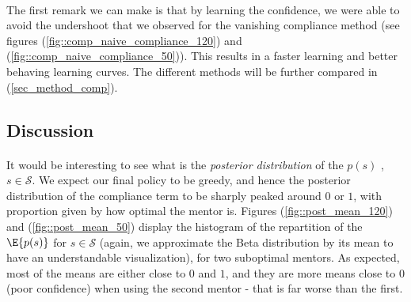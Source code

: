 \documentclass[a4paper]{report}
\begin{document}
{{{{			\paragraph{} The first remark we can make is that by learning the confidence, we were able  to avoid the undershoot that we observed for the vanishing compliance method (see figures (\ref{fig::comp_naive_compliance_120}) and (\ref{fig::comp_naive_compliance_50})). This results in a faster learning and better behaving learning curves. The different methods will be further compared in (\ref{sec_method_comp}). 
			}
			\subsection{Discussion}
			{
				\paragraph{} It would be interesting to see what is the \emph{posterior distribution} of the $p(s)$ , $s\in\mathcal{S}$. We expect our final policy to be greedy, and hence the posterior distribution of the compliance term to be sharply peaked around $0$ or $1$, with proportion given by how optimal the mentor is. Figures (\ref{fig::post_mean_120}) and (\ref{fig::post_mean_50}) display the histogram of the repartition of the $\E{p(s)}$ for $s\in\mathcal{S}$ (again, we approximate the Beta distribution by its mean to have an understandable visualization), for two suboptimal mentors. As expected, most of the means are either close to $0$ and $1$, and they are more means close to 0 (poor confidence) when using the second mentor - that is far worse than the first. 
				
}}}}
\end{document}
